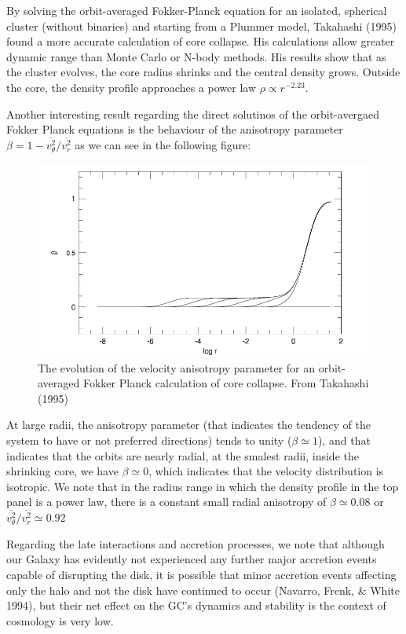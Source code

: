By solving the orbit-averaged Fokker-Planck equation for an isolated, spherical cluster (without binaries) and starting from a Plummer model, Takahashi (1995) found a more accurate calculation of core collapse. His calculations allow greater dynamic range than Monte Carlo or N-body methods. His results show that as the cluster evolves, the core radius shrinks  and the central density grows. Outside the core, the density profile approaches a power law $\rho\varpropto r^{-2.23}$.

Another interesting result regarding the direct solutinos of the orbit-avergaed Fokker Planck equations is the behaviour of the anisotropy parameter $\beta=1-\overline{v_{\theta}^{2}}/\overline{v_{r}^{2}}$ as we can see in the following figure:

\begin{figure}[H]
\centering
\includegraphics[width=12cm]{images/anisotropy_core_collapse.png}
\caption[Evolution of the velocity anisotropy parameter]{The evolution of the velocity anisotropy parameter for an orbit-averaged Fokker Planck calculation of core collapse. From Takahashi (1995)}
\end{figure}

At large radii, the anisotropy parameter (that indicates the tendency of the system to have or not preferred directions) tends to unity ($\beta\simeq1$), and that indicates that the orbits are nearly radial, at the smalest radii, inside the shrinking core, we have $\beta\simeq0$, which indicates that the velocity distribution is isotropic. We note that in the radius range in which the density profile in the top panel is a power law, there is a constant small radial anisotropy of $\beta\simeq0.08$ or  $\overline{v_{\theta}^{2}}/\overline{v_{r}^{2}}\simeq0.92$

Regarding the late interactions and accretion processes, we note that although our Galaxy has evidently not experienced any further major accretion events capable of disrupting the disk, it is possible that minor accretion events affecting only the halo and not the disk have continued to occur (Navarro, Frenk, \& White 1994), but their net effect on the GC's dynamics and stability is the context of cosmology is very low.

